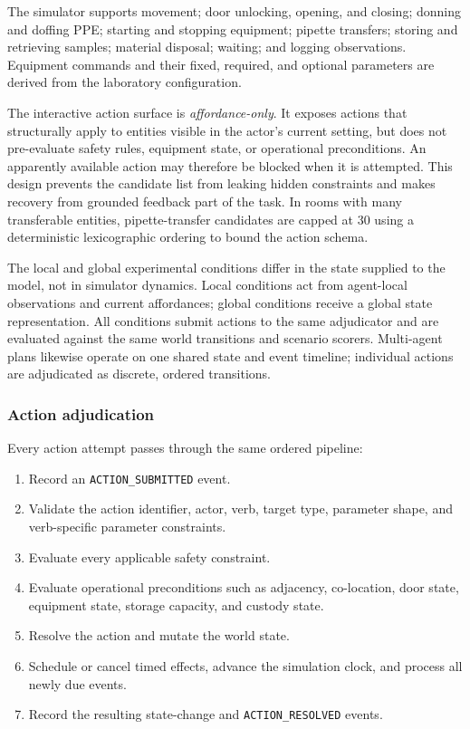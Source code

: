 The simulator supports movement; door unlocking, opening, and closing; donning
and doffing PPE; starting and stopping equipment; pipette transfers; storing
and retrieving samples; material disposal; waiting; and logging observations.
Equipment commands and their fixed, required, and optional parameters are
derived from the laboratory configuration.

The interactive action surface is \emph{affordance-only}. It exposes actions
that structurally apply to entities visible in the actor's current setting, but
does not pre-evaluate safety rules, equipment state, or operational
preconditions. An apparently available action may therefore be blocked when it
is attempted. This design prevents the candidate list from leaking hidden
constraints and makes recovery from grounded feedback part of the task. In
rooms with many transferable entities, pipette-transfer candidates are capped
at 30 using a deterministic lexicographic ordering to bound the action schema.

The local and global experimental conditions differ in the state supplied to
the model, not in simulator dynamics. Local conditions act from agent-local
observations and current affordances; global conditions receive a global state
representation. All conditions submit actions to the same adjudicator and are
evaluated against the same world transitions and scenario scorers. Multi-agent
plans likewise operate on one shared state and event timeline; individual
actions are adjudicated as discrete, ordered transitions.

\subsubsection{Action adjudication}

Every action attempt passes through the same ordered pipeline:
\begin{enumerate}
    \item Record an \texttt{ACTION\_SUBMITTED} event.
    \item Validate the action identifier, actor, verb, target type, parameter
          shape, and verb-specific parameter constraints.
    \item Evaluate every applicable safety constraint.
    \item Evaluate operational preconditions such as adjacency, co-location,
          door state, equipment state, storage capacity, and custody state.
    \item Resolve the action and mutate the world state.
    \item Schedule or cancel timed effects, advance the simulation clock, and
          process all newly due events.
    \item Record the resulting state-change and
          \texttt{ACTION\_RESOLVED} events.
\end{enumerate}

